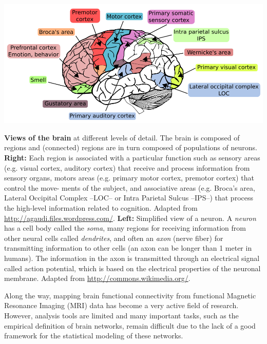  \begin{pagefigure}
    \centering
    \def\svgwidth{.23\columnwidth}
    
    \includegraphics[width=.74\linewidth]{figures/brain_function.png}    
    \caption{\textbf{Views of the brain} at different levels of detail. The brain is composed of regions and (connected) regions are in turn composed of populations of neurons.
\textbf{Right:} Each region is associated with a particular
function such as sensory areas (e.g.
visual cortex, auditory cortex) that
receive and process information
from sensory organs, motors areas
(e.g. primary motor cortex, premotor cortex) that control the move-
ments of the subject, and associative areas (e.g. Broca’s area,
Lateral Occipital Complex --LOC-- or Intra Parietal Sulcus  --IPS--)
that process the high-level information related to cognition.
Adapted from \url{http://agaudi.files.wordpress.com/}.
\textbf{Left:} Simplified view of a neuron.
A \textit{neuron} has a cell body
called the \textit{soma}, many regions for receiving information from other neural cells
called \textit{dendrites}, and often an \textit{axon} (nerve
fiber) for transmitting information to other
cells (an axon can be longer than 1 meter in humans).
The information in the axon is transmitted through an electrical
signal called action potential, which is based on the electrical
properties of the neuronal membrane. Adapted from
\url{http://commons.wikimedia.org/}.
}
\end{pagefigure}

Along the way, mapping brain functional connectivity from functional Magnetic Resonance Imaging (MRI) data has become
a very active field of research. However, analysis tools are limited and many important tasks, such as the empirical
definition of brain networks, remain difficult due to the lack of a good framework for the statistical
modeling of these networks.

